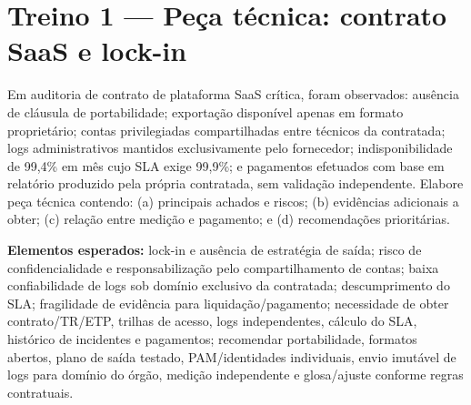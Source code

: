 \section{Treino 1 — Peça técnica: contrato SaaS e lock-in}

\begin{discursiva}
Em auditoria de contrato de plataforma SaaS crítica, foram observados: ausência de cláusula de portabilidade; exportação disponível apenas em formato proprietário; contas privilegiadas compartilhadas entre técnicos da contratada; logs administrativos mantidos exclusivamente pelo fornecedor; indisponibilidade de 99,4\% em mês cujo SLA exige 99,9\%; e pagamentos efetuados com base em relatório produzido pela própria contratada, sem validação independente. Elabore peça técnica contendo: (a) principais achados e riscos; (b) evidências adicionais a obter; (c) relação entre medição e pagamento; e (d) recomendações prioritárias.
\end{discursiva}

\begin{resumo}
\textbf{Elementos esperados:} lock-in e ausência de estratégia de saída; risco de confidencialidade e responsabilização pelo compartilhamento de contas; baixa confiabilidade de logs sob domínio exclusivo da contratada; descumprimento do SLA; fragilidade de evidência para liquidação/pagamento; necessidade de obter contrato/TR/ETP, trilhas de acesso, logs independentes, cálculo do SLA, histórico de incidentes e pagamentos; recomendar portabilidade, formatos abertos, plano de saída testado, PAM/identidades individuais, envio imutável de logs para domínio do órgão, medição independente e glosa/ajuste conforme regras contratuais.
\end{resumo}

